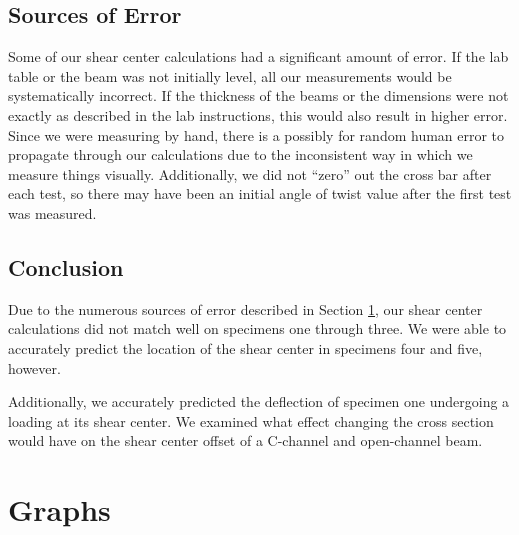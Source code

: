 \documentclass[12 pt]{report}
\begin{document}
\section{Sources of Error}\label{sources_of_error}
Some of our shear center calculations had a significant amount of error. If the lab table or the beam was not initially level, all our measurements would be systematically incorrect. If the thickness of the beams or the dimensions were not exactly as described in the lab instructions, this would also result in higher error. Since we were measuring by hand, there is a possibly for random human error to propagate through our calculations due to the inconsistent way in which we measure things visually. Additionally, we did not ``zero'' out the cross bar after each test, so there may have been an initial angle of twist value after the first test was measured.

\section{Conclusion} \label{conclusion-section}
Due to the numerous sources of error described in Section \ref{sources_of_error}, our shear center calculations did not match well on specimens one through three. We were able to accurately predict the location of the shear center in specimens four and five, however.

Additionally, we accurately predicted the deflection of specimen one undergoing a loading at its shear center. We examined what effect changing the cross section would have on the shear center offset of a C-channel and open-channel beam.

\printbibliography[heading=subbibintoc]
\appendix
\chapter{Graphs}
\end{document}
